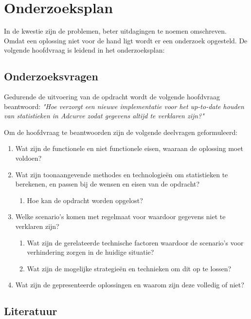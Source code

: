 \chapter{Onderzoeksplan}

In de kwestie zijn de problemen, beter uitdagingen te noemen omschreven. Omdat een oplossing niet voor de hand ligt wordt er een onderzoek opgesteld. De volgende hoofdvraag is leidend in het onderzoeksplan:

\section{Onderzoeksvragen}
Gedurende de uitvoering van de opdracht wordt de volgende hoofdvraag beantwoord: 
\textit{"Hoe verzorgt een nieuwe implementatie voor het up-to-date houden van statistieken in Adcurve zodat gegevens altijd te verklaren zijn?"}

Om de hoofdvraag te beantwoorden zijn de volgende deelvragen geformuleerd:
\begin{enumerate}
\item Wat zijn de functionele en niet functionele eisen, waaraan de oplossing moet voldoen?
\item Wat zijn toonaangevende methodes en technologieën om statistieken te berekenen, en passen bij de wensen en eisen van de opdracht?
\begin{enumerate}
    \item Hoe kan de opdracht worden opgelost?
\end{enumerate}
\item Welke scenario's komen met regelmaat voor waardoor gegevens niet te verklaren zijn?
\begin{enumerate}
    \item Wat zijn de gerelateerde technische factoren waardoor de scenario's voor verhindering zorgen in de huidige situatie?
    \item Wat zijn de mogelijke strategieën en technieken om dit op te lossen?
\end{enumerate}

\item Wat zijn de gepresenteerde oplossingen en waarom zijn deze volledig of niet?
\end{enumerate}

\section{Literatuur} %

